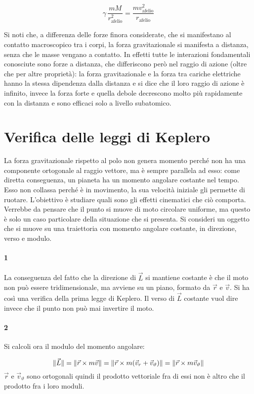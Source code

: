 \[
	\gamma\,\frac{mM}{r_\text{afelio}^2}=\frac{mv_\text{afelio}^2}{r_\text{afelio}}
\]

Si noti che, a differenza delle forze finora considerate, che si manifestano al contatto macroscopico tra i corpi, la forza gravitazionale si manifesta a distanza, senza che le masse vengano a contatto. In effetti tutte le interazioni fondamentali conosciute sono forze a distanza, che differiscono però nel raggio di azione (oltre che per altre proprietà): la forza gravitazionale e la forza tra cariche elettriche hanno la stessa dipendenza dalla distanza e si dice che il loro raggio di azione è infinito, invece la forza forte e quella debole decrescono molto più rapidamente con la distanza e sono efficaci solo a livello subatomico.

\section{Verifica delle leggi di Keplero}

La forza gravitazionale rispetto al polo non genera momento perché non ha una componente ortogonale al raggio vettore, ma è sempre parallela ad esso: come diretta conseguenza, un pianeta ha un momento angolare costante nel tempo. Esso non collassa perché è in movimento, la sua velocità iniziale gli permette di ruotare. L'obiettivo è studiare quali sono gli effetti cinematici che ciò comporta. Verrebbe da pensare che il punto si muove di moto circolare uniforme, ma questo è solo un caso particolare della situazione che si presenta.
Si consideri un oggetto che si muove su una traiettoria con momento angolare costante, in direzione, verso e modulo.

\paragraph{1} La conseguenza del fatto che la direzione di $\vec{L}$ si mantiene costante è che il moto non può essere tridimensionale, ma avviene su un piano, formato da $\vec{r}$ e $\vec{v}$. Si ha così una verifica della prima legge di Keplero. Il verso di $\vec{L}$ costante vuol dire invece che il punto non può mai invertire il moto.

\paragraph{2} Si calcoli ora il modulo del momento angolare:

\[
	\lVert\vec{L}\rVert=\lVert\vec{r}\times m\vec{v}\rVert=\lVert\vec{r}\times m(\vec{v}_r+\vec{v}_\vartheta)\rVert=\lVert\vec{r}\times m \vec{v}_\vartheta\rVert
\]
$\vec{r}$ e $\vec{v}_\vartheta$ sono ortogonali quindi il prodotto vettoriale fra di essi non è altro che il prodotto fra i loro moduli.

